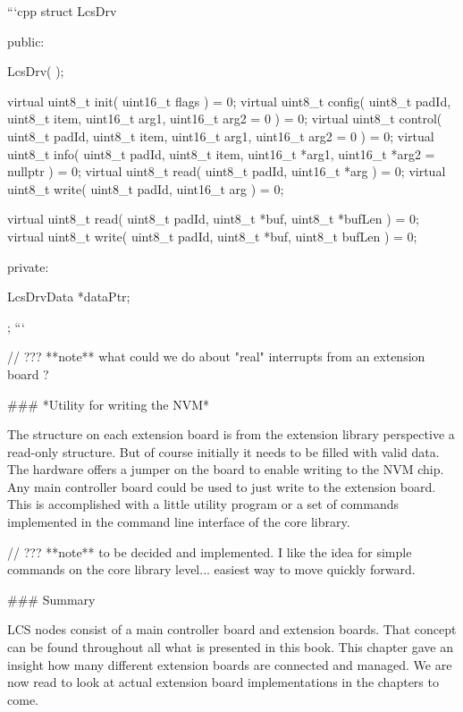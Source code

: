 ```cpp
struct LcsDrv {

   public:

      LcsDrv( );

      virtual uint8_t init( uint16_t flags ) = 0;
      virtual uint8_t config( uint8_t padId, uint8_t item, uint16_t arg1, uint16_t arg2 = 0 ) = 0;
      virtual uint8_t control( uint8_t padId, uint8_t item, uint16_t arg1, uint16_t arg2 = 0 ) = 0;
      virtual uint8_t info( uint8_t padId, uint8_t item, uint16_t *arg1, uint16_t *arg2 = nullptr ) = 0;
      virtual uint8_t read( uint8_t padId, uint16_t *arg ) = 0;
      virtual uint8_t write( uint8_t padId, uint16_t arg ) = 0;

      virtual uint8_t read( uint8_t padId, uint8_t *buf, uint8_t *bufLen ) = 0;
      virtual uint8_t write( uint8_t padId, uint8_t *buf, uint8_t bufLen ) = 0;

   private:

      LcsDrvData *dataPtr;
  };
```

// ??? **note** what could we do about "real" interrupts from an extension board ?

### *Utility for writing the NVM*

The structure on each extension board is from the extension library perspective a read-only structure. But of course initially it needs to be filled with valid data. The hardware offers a jumper on the board to enable writing to the NVM chip. Any main controller board could be used to just write to the extension board. This is accomplished with a little utility program or a set of commands implemented in the command line interface of the core library.

// ??? **note**  to be decided and implemented. I like the idea for simple commands on the core library level... easiest way to move quickly forward.

### Summary

LCS nodes consist of a main controller board and extension boards. That concept can be found throughout all what is presented in this book. This chapter gave an insight how many different extension boards are connected and managed. We are now read to look at actual extension board implementations in the chapters to come.

